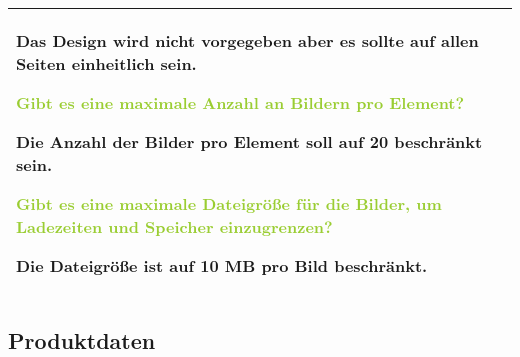 \begin{tabular}[ht] {l | p{13cm}}
    \textcolor{NavyBlue}{Das Design wird nicht vorgegeben aber es sollte auf allen Seiten einheitlich sein.}

    \textcolor{YellowGreen}{Gibt es eine maximale Anzahl an Bildern pro Element?}

    \textcolor{NavyBlue}{Die Anzahl der Bilder pro Element soll auf 20 beschränkt sein.}

    \textcolor{YellowGreen}{Gibt es eine maximale Dateigröße für die Bilder, um Ladezeiten und Speicher einzugrenzen?}

    \textcolor{NavyBlue}{Die Dateigröße ist auf 10 MB pro Bild beschränkt.}
    \\
    \hline
\end{tabular}

\subsection{Produktdaten}

